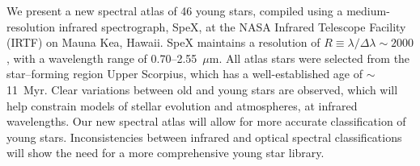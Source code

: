 We present a new spectral atlas of 46 young stars, compiled using a medium-resolution 
infrared spectrograph, SpeX, at the NASA Infrared Telescope Facility (IRTF) on Mauna Kea, Hawaii.  
SpeX maintains a resolution of $R \equiv \lambda/\Delta\lambda \sim 2000$, with a wavelength 
range of 0.70--2.55~$\mu$m. All atlas stars were selected from the star--forming region 
Upper Scorpius, which has a well-established age of $\sim$11~Myr. Clear variations between 
old and young stars are observed, which will help constrain models of stellar evolution and 
atmospheres, at infrared wavelengths. Our new spectral atlas will allow for more accurate 
classification of young stars.  Inconsistencies between infrared and optical spectral 
classifications will show the need for a more comprehensive young star library.